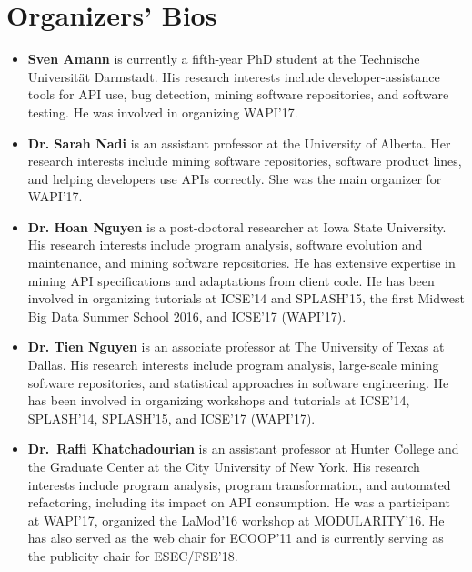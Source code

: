 \documentclass[10pt, conference]{IEEEtran}
\begin{document}
\section{Organizers' Bios}
\begin{itemize}
\setlength\itemsep{5pt}
\item \textbf{Sven Amann} is currently a fifth-year PhD student at the Technische Universit\"{a}t Darmstadt. His research interests include developer-assistance tools for API use, bug detection, mining software repositories, and software testing. He was involved in organizing WAPI'17.

\item \textbf{Dr. Sarah Nadi} is an assistant professor at the University of Alberta. Her research interests include mining software repositories, software product lines, and helping developers use APIs correctly. She was the main organizer for WAPI'17.

\item \textbf{Dr. Hoan Nguyen} is a post-doctoral researcher at Iowa State University. His research interests include program analysis, software evolution and maintenance, and mining software repositories. He has extensive expertise in mining API specifications and adaptations from client code. He has been involved in organizing tutorials at ICSE'14 and SPLASH'15, the first Midwest Big Data Summer School 2016, and ICSE'17 (WAPI'17).

\item \textbf{Dr. Tien Nguyen} is an associate professor at The University of Texas at Dallas. His research interests include program analysis, large-scale mining software repositories, and statistical approaches in software engineering. He has been involved in organizing workshops and tutorials at ICSE’14, SPLASH’14, SPLASH’15, and ICSE'17 (WAPI'17).

\item \textbf{Dr.~Raffi Khatchadourian} is an assistant professor at Hunter College and the Graduate Center at the City University of New York. His research interests include program analysis, program transformation, and automated refactoring, including its impact on API consumption. He was a participant at WAPI'17, organized the LaMod'16 workshop at MODULARITY'16. He has also served as the web chair for ECOOP'11 and is currently serving as the publicity chair for ESEC/FSE'18.
\end{itemize}
\end{document}
